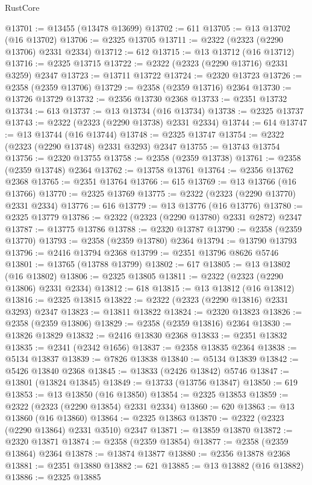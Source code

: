 \begin{lexlean}{RustCore}
\begin{coremodule}
@13701 := @13455 (@13478 @13699)
@13702 := 611
@13705 := @13 @13702 (@16 @13702)
@13706 := @2325 @13705
@13711 := @2322 (@2323 (@2290 @13706) @2331 @2334)
@13712 := 612
@13715 := @13 @13712 (@16 @13712)
@13716 := @2325 @13715
@13722 := @2322 (@2323 (@2290 @13716) @2331 @3259) @2347
@13723 := @13711 @13722
@13724 := @2320 @13723
@13726 := @2358 (@2359 @13706)
@13729 := @2358 (@2359 @13716) @2364
@13730 := @13726 @13729
@13732 := @2356 @13730 @2368
@13733 := @2351 @13732
@13734 := 613
@13737 := @13 @13734 (@16 @13734)
@13738 := @2325 @13737
@13743 := @2322 (@2323 (@2290 @13738) @2331 @2334)
@13744 := 614
@13747 := @13 @13744 (@16 @13744)
@13748 := @2325 @13747
@13754 := @2322 (@2323 (@2290 @13748) @2331 @3293) @2347
@13755 := @13743 @13754
@13756 := @2320 @13755
@13758 := @2358 (@2359 @13738)
@13761 := @2358 (@2359 @13748) @2364
@13762 := @13758 @13761
@13764 := @2356 @13762 @2368
@13765 := @2351 @13764
@13766 := 615
@13769 := @13 @13766 (@16 @13766)
@13770 := @2325 @13769
@13775 := @2322 (@2323 (@2290 @13770) @2331 @2334)
@13776 := 616
@13779 := @13 @13776 (@16 @13776)
@13780 := @2325 @13779
@13786 := @2322 (@2323 (@2290 @13780) @2331 @2872) @2347
@13787 := @13775 @13786
@13788 := @2320 @13787
@13790 := @2358 (@2359 @13770)
@13793 := @2358 (@2359 @13780) @2364
@13794 := @13790 @13793
@13796 := @2416 @13794 @2368
@13799 := @2351 @13796 @8626 @5746
@13801 := @13765 (@13788 @13799)
@13802 := 617
@13805 := @13 @13802 (@16 @13802)
@13806 := @2325 @13805
@13811 := @2322 (@2323 (@2290 @13806) @2331 @2334)
@13812 := 618
@13815 := @13 @13812 (@16 @13812)
@13816 := @2325 @13815
@13822 := @2322 (@2323 (@2290 @13816) @2331 @3293) @2347
@13823 := @13811 @13822
@13824 := @2320 @13823
@13826 := @2358 (@2359 @13806)
@13829 := @2358 (@2359 @13816) @2364
@13830 := @13826 @13829
@13832 := @2416 @13830 @2368
@13833 := @2351 @13832
@13835 := @2341 (@2342 @1656)
@13837 := @2358 @13835 @2364
@13838 := @5134 @13837
@13839 := @7826 @13838
@13840 := @5134 @13839
@13842 := @5426 @13840 @2368
@13845 := @13833 (@2426 @13842) @5746
@13847 := @13801 (@13824 @13845)
@13849 := @13733 (@13756 @13847)
@13850 := 619
@13853 := @13 @13850 (@16 @13850)
@13854 := @2325 @13853
@13859 := @2322 (@2323 (@2290 @13854) @2331 @2334)
@13860 := 620
@13863 := @13 @13860 (@16 @13860)
@13864 := @2325 @13863
@13870 := @2322 (@2323 (@2290 @13864) @2331 @3510) @2347
@13871 := @13859 @13870
@13872 := @2320 @13871
@13874 := @2358 (@2359 @13854)
@13877 := @2358 (@2359 @13864) @2364
@13878 := @13874 @13877
@13880 := @2356 @13878 @2368
@13881 := @2351 @13880
@13882 := 621
@13885 := @13 @13882 (@16 @13882)
@13886 := @2325 @13885

\end{coremodule}
\end{lexlean}
